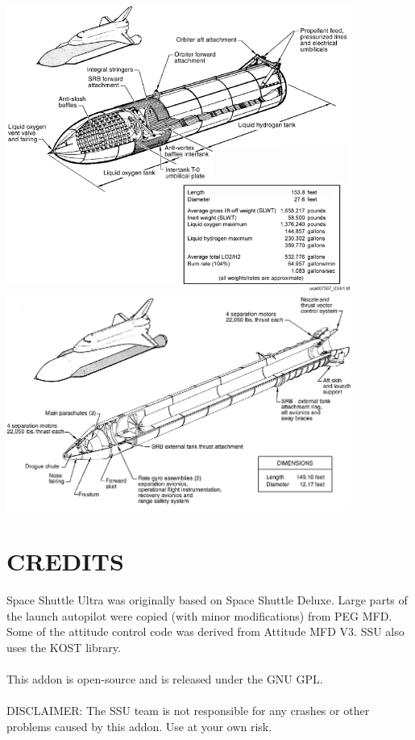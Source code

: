 \documentclass[13pt]{article}
\begin{document}
\includegraphics[width=0.85\textwidth]{SLWT.png}
\includegraphics[width=0.85\textwidth]{SRB.png}


\newpage

\newpage

\newpage

\newpage


\newpage
\section{\large CREDITS}
Space Shuttle Ultra was originally based on Space Shuttle Deluxe. Large parts of the launch autopilot were copied (with minor modifications) from PEG MFD.
Some of the attitude control code was derived from Attitude MFD V3.
SSU also uses the KOST library. \\
\\
This addon is open-source and is released under the GNU GPL. \\
\\
DISCLAIMER: The SSU team is not responsible for any crashes or other problems caused by this addon. Use at your own risk.
\end{document}

